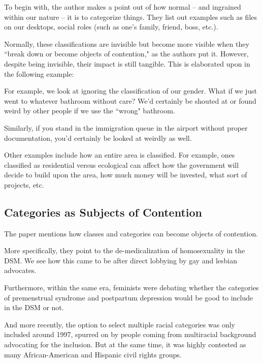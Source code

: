 \documentclass[openany]{book}
\begin{document}
To begin with, the author makes a point out of how normal -- and ingrained within our nature -- it is to categorize things. They list out examples such as files on our desktops, social roles (such as one's family, friend, boss, etc.).

Normally, these classifications are invisible but become more visible when they ``break down or become objects of contention," as the authors put it. However, despite being invisible, their impact is still tangible. This is elaborated upon in the following example:

\begin{example}
	For example, we look at ignoring the classification of our gender. What if we just went to whatever bathroom without care? We'd certainly be shouted at or found weird by other people if we use the ``wrong" bathroom.
	
	Similarly, if you stand in the immigration queue in the airport without proper documentation, you'd certainly be looked at weirdly as well.
\end{example}

\begin{example}
	Other examples include how an entire area is classified. For example, ones classified as residential versus ecological can affect how the government will decide to build upon the area, how much money will be invested, what sort of projects, etc.
\end{example}

\subsection{Categories as Subjects of Contention}
The paper mentions how classes and categories can become objects of contention. 

More specifically, they point to the de-medicalization of homosexuality in the DSM. We see how this came to be after direct lobbying by gay and lesbian advocates.

Furthermore, within the same era, feminists were debating whether the categories of premenstrual syndrome and postpartum depression would be good to include in the DSM or not.

And more recently, the option to select multiple racial categories was only included around 1997, spurred on by people coming from multiracial background advocating for the inclusion. But at the same time, it was highly contested as many African-American and Hispanic civil rights groups.
\end{document}
